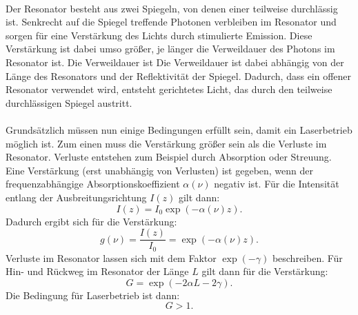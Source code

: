 \\
Der Resonator besteht aus zwei Spiegeln, von denen einer teilweise durchlässig ist. Senkrecht auf die Spiegel treffende Photonen verbleiben im Resonator und sorgen für 
eine Verstärkung des Lichts durch stimulierte Emission. Diese Verstärkung ist dabei umso größer, je länger die Verweildauer des Photons im Resonator ist. Die Verweildauer ist
Die Verweildauer ist dabei abhängig von der Länge des Resonators und der Reflektivität der Spiegel. Dadurch, dass ein offener Resonator verwendet wird, entsteht gerichtetes Licht, das durch den
teilweise durchlässigen Spiegel austritt.\\
\\
Grundsätzlich müssen nun einige Bedingungen erfüllt sein, damit ein Laserbetrieb möglich ist. Zum einen muss die Verstärkung größer sein als die Verluste im Resonator. Verluste entstehen
zum Beispiel durch Absorption oder Streuung. Eine Verstärkung (erst unabhängig von Verlusten) ist gegeben, wenn der frequenzabhängige Absorptionskoeffizient $\alpha(\nu)$ negativ ist.
Für die Intensität entlang der Ausbreitungsrichtung $I(z)$ gilt dann:
\begin{equation*}
    I(z) = I_0 \exp\left(-\alpha(\nu)z\right).
\end{equation*}
Dadurch ergibt sich für die Verstärkung:
\begin{equation*}
    g(\nu) = \frac{I(z)}{I_0} = \exp\left(-\alpha(\nu)z\right).
\end{equation*}
Verluste im Resonator lassen sich mit dem Faktor $\exp(-\gamma)$ beschreiben. Für Hin- und Rückweg im Resonator der Länge $L$ gilt dann für die Verstärkung:
\begin{equation*}
    G = \exp(-2\alpha L - 2\gamma).
\end{equation*}
Die Bedingung für Laserbetrieb ist dann:
\begin{equation*}
    G > 1.
\end{equation*}


\newpage
